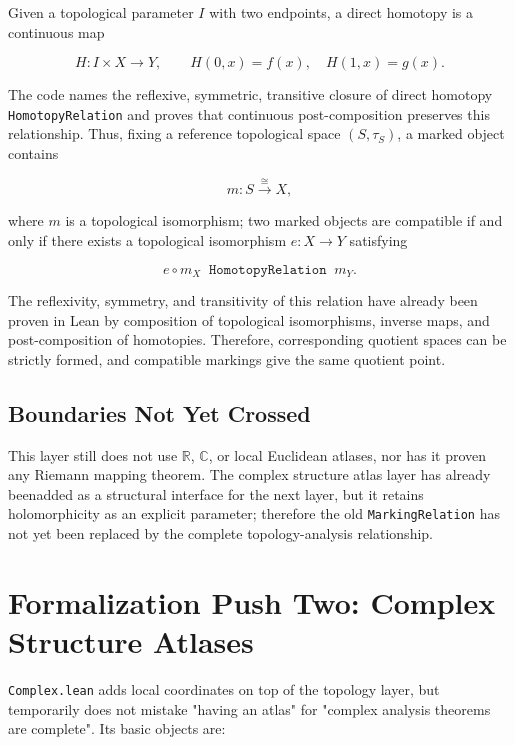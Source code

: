 \documentclass[UTF8,a4paper,11pt]{article}
\begin{document}
Given a topological parameter $I$ with two endpoints, a direct homotopy is a continuous map

\[
H:I\times X\longrightarrow Y,
\qquad H(0,x)=f(x),\quad H(1,x)=g(x).
\]

The code names the reflexive, symmetric, transitive closure of direct homotopy \texttt{HomotopyRelation} and proves that continuous post-composition preserves this relationship. Thus, fixing a reference topological space $(S,\tau_S)$, a marked object contains

\[
m:S\xrightarrow{\cong}X,
\]

where $m$ is a topological isomorphism; two marked objects are compatible if and only if there exists a topological isomorphism $e:X\to Y$ satisfying

\[
e\circ m_X\;\mathrel{\texttt{HomotopyRelation}}\;m_Y.
\]

The reflexivity, symmetry, and transitivity of this relation have already been proven in Lean by composition of topological isomorphisms, inverse maps, and post-composition of homotopies. Therefore, corresponding quotient spaces can be strictly formed, and compatible markings give the same quotient point.

\subsection{Boundaries Not Yet Crossed}

This layer still does not use $\mathbb R$, $\mathbb C$, or local Euclidean atlases, nor has it proven any Riemann mapping theorem. The complex structure atlas layer has already beenadded as a structural interface for the next layer, but it retains holomorphicity as an explicit parameter; therefore the old \texttt{MarkingRelation} has not yet been replaced by the complete topology-analysis relationship.

\section{Formalization Push Two: Complex Structure Atlases}

\texttt{Complex.lean} adds local coordinates on top of the topology layer, but temporarily does not mistake "having an atlas" for "complex analysis theorems are complete". Its basic objects are:
\end{document}
